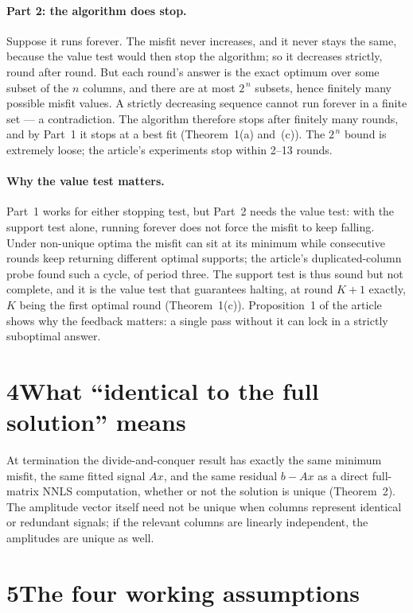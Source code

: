 \documentclass[pdflatex,sn-mathphys-num]{sn-jnl}
\begin{document}
\paragraph{Part 2: the algorithm does stop.}
Suppose it runs forever. The misfit never increases, and it never
stays the same, because the value test would then stop the algorithm;
so it decreases strictly, round after round. But each round's answer
is the exact optimum over some subset of the $n$ columns, and there
are at most $2^{\,n}$ subsets, hence finitely many possible misfit
values. A strictly decreasing sequence cannot run forever in a finite
set --- a contradiction. The algorithm therefore stops after finitely
many rounds, and by Part~1 it stops at a best fit (Theorem~1(a)
and~(c)). The $2^{\,n}$ bound is extremely loose; the article's
experiments stop within 2--13 rounds.

\paragraph{Why the value test matters.}
Part~1 works for either stopping test, but Part~2 needs the value
test: with the support test alone, running forever does not force the
misfit to keep falling. Under non-unique optima the misfit can sit at
its minimum while consecutive rounds keep returning different optimal
supports; the article's duplicated-column probe found such a cycle,
of period three. The support test is thus sound but not complete, and
it is the value test that guarantees halting, at round $K{+}1$
exactly, $K$ being the first optimal round (Theorem~1(c)).
Proposition~1 of the article shows why the feedback matters: a single
pass without it can lock in a strictly suboptimal answer.

\section*{4\quad What ``identical to the full solution'' means}

At termination the divide-and-conquer result has exactly the same
minimum misfit, the same fitted signal $Ax$, and the same residual
$b-Ax$ as a direct full-matrix NNLS computation, whether or not the
solution is unique (Theorem~2). The amplitude vector itself need not be unique when
columns represent identical or redundant signals; if the relevant
columns are linearly independent, the amplitudes are unique as well.

\section*{5\quad The four working assumptions}
\end{document}

